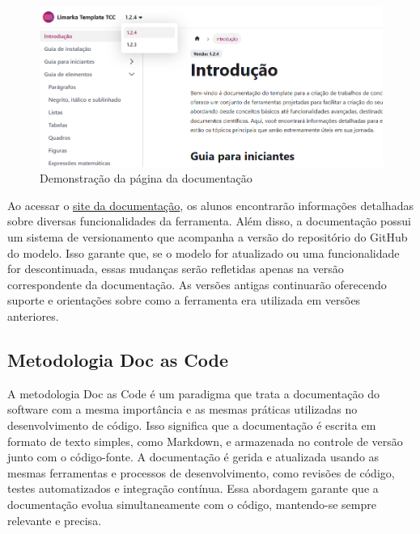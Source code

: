 \documentclass[
	12pt,				%
	oneside,			%
	a4paper,			%
	english,			%
	french,				%
	spanish,			%
	brazil				%
	]{abntex2}
\begin{document}
\begin{figure}[htbp]
\hypertarget{limarka_template_docs}{%
\caption{Demonstração da página da documentação}\label{limarka_template_docs}
\begin{center}
\includegraphics[scale=0.6]{imagens/screenshot/limarka-template-docs.png}
\end{center}
}
\end{figure}

Ao acessar o
\href{https://reinanhs.github.io/limarka-template-docs}{site da
documentação}, os alunos encontrarão informações detalhadas sobre
diversas funcionalidades da ferramenta. Além disso, a documentação
possui um sistema de versionamento que acompanha a versão do repositório
do GitHub do modelo. Isso garante que, se o modelo for atualizado ou uma
funcionalidade for descontinuada, essas mudanças serão refletidas apenas
na versão correspondente da documentação. As versões antigas continuarão
oferecendo suporte e orientações sobre como a ferramenta era utilizada
em versões anteriores.

\hypertarget{metodologia-doc-as-code}{%
\subsection{Metodologia Doc as Code}\label{metodologia-doc-as-code}}

A metodologia Doc as Code é um paradigma que trata a documentação do
software com a mesma importância e as mesmas práticas utilizadas no
desenvolvimento de código. Isso significa que a documentação é escrita
em formato de texto simples, como Markdown, e armazenada no controle de
versão junto com o código-fonte. A documentação é gerida e atualizada
usando as mesmas ferramentas e processos de desenvolvimento, como
revisões de código, testes automatizados e integração contínua. Essa
abordagem garante que a documentação evolua simultaneamente com o
código, mantendo-se sempre relevante e precisa.
\end{document}
